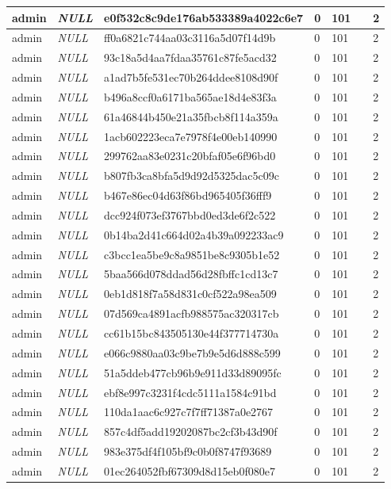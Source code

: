\begin{longtable}{|l|l|l|l|l|l|l|}
admin & \textit{NULL} & e0f532c8c9de176ab533389a4022c6e7 & 0 & 101 &  & 2 \\ \hline 
admin & \textit{NULL} & ff0a6821c744aa03c3116a5d07f14d9b & 0 & 101 &  & 2 \\ \hline 
admin & \textit{NULL} & 93c18a5d4aa7fdaa35761c87fe5acd32 & 0 & 101 &  & 2 \\ \hline 
admin & \textit{NULL} & a1ad7b5fe531ec70b264ddee8108d90f & 0 & 101 &  & 2 \\ \hline 
admin & \textit{NULL} & b496a8ccf0a6171ba565ae18d4e83f3a & 0 & 101 &  & 2 \\ \hline 
admin & \textit{NULL} & 61a46844b450e21a35fbcb8f114a359a & 0 & 101 &  & 2 \\ \hline 
admin & \textit{NULL} & 1acb602223eca7e7978f4e00eb140990 & 0 & 101 &  & 2 \\ \hline 
admin & \textit{NULL} & 299762aa83e0231c20bfaf05e6f96bd0 & 0 & 101 &  & 2 \\ \hline 
admin & \textit{NULL} & b807fb3ca8bfa5d9d92d5325dac5c09c & 0 & 101 &  & 2 \\ \hline 
admin & \textit{NULL} & b467e86ec04d63f86bd965405f36fff9 & 0 & 101 &  & 2 \\ \hline 
admin & \textit{NULL} & dcc924f073ef3767bbd0ed3de6f2c522 & 0 & 101 &  & 2 \\ \hline 
admin & \textit{NULL} & 0b14ba2d41c664d02a4b39a092233ac9 & 0 & 101 &  & 2 \\ \hline 
admin & \textit{NULL} & c3bcc1ea5be9c8a9851be8c9305b1e52 & 0 & 101 &  & 2 \\ \hline 
admin & \textit{NULL} & 5baa566d078ddad56d28fbffc1cd13c7 & 0 & 101 &  & 2 \\ \hline 
admin & \textit{NULL} & 0eb1d818f7a58d831c0cf522a98ea509 & 0 & 101 &  & 2 \\ \hline 
admin & \textit{NULL} & 07d569ca4891acfb988575ac320317cb & 0 & 101 &  & 2 \\ \hline 
admin & \textit{NULL} & cc61b15bc843505130e44f377714730a & 0 & 101 &  & 2 \\ \hline 
admin & \textit{NULL} & e066c9880aa03c9be7b9e5d6d888c599 & 0 & 101 &  & 2 \\ \hline 
admin & \textit{NULL} & 51a5ddeb477cb96b9e911d33d89095fc & 0 & 101 &  & 2 \\ \hline 
admin & \textit{NULL} & ebf8e997c3231f4cdc5111a1584c91bd & 0 & 101 &  & 2 \\ \hline 
admin & \textit{NULL} & 110da1aac6c927c7f7ff71387a0e2767 & 0 & 101 &  & 2 \\ \hline 
admin & \textit{NULL} & 857c4df5add19202087bc2cf3b43d90f & 0 & 101 &  & 2 \\ \hline 
admin & \textit{NULL} & 983e375df4f105bf9c0b0f8747f93689 & 0 & 101 &  & 2 \\ \hline 
admin & \textit{NULL} & 01ec264052fbf67309d8d15eb0f080e7 & 0 & 101 &  & 2 \\ \hline 
 \end{longtable}

